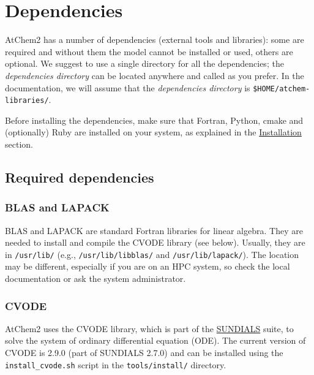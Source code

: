 \section{Dependencies} \label{sec:dependencies}

AtChem2 has a number of dependencies (external tools and libraries):
some are required and without them the model cannot be installed or
used, others are optional. We suggest to use a single directory for
all the dependencies; the \emph{dependencies directory} can be located
anywhere and called as you prefer. In the documentation, we will
assume that the \emph{dependencies directory} is
\texttt{\$HOME/atchem-libraries/}.

Before installing the dependencies, make sure that Fortran, Python,
cmake and (optionally) Ruby are installed on your system, as explained
in the \hyperref[sec:install]{Installation} section.

\subsection{Required dependencies} \label{subsec:required-dependencies}

\subsubsection{BLAS and LAPACK} \label{blas-and-lapack}

BLAS and LAPACK are standard Fortran libraries for linear
algebra. They are needed to install and compile the CVODE library (see
below). Usually, they are in \texttt{/usr/lib/} (e.g.,
\texttt{/usr/lib/libblas/} and \texttt{/usr/lib/lapack/}). The
location may be different, especially if you are on an HPC system, so
check the local documentation or ask the system administrator.

\subsubsection{CVODE} \label{cvode}

AtChem2 uses the CVODE library, which is part of the
\href{https://computation.llnl.gov/projects/sundials}{SUNDIALS} suite,
to solve the system of ordinary differential equation (ODE). The
current version of CVODE is 2.9.0 (part of SUNDIALS 2.7.0) and can be
installed using the \texttt{install\_cvode.sh} script in the
\texttt{tools/install/} directory.


